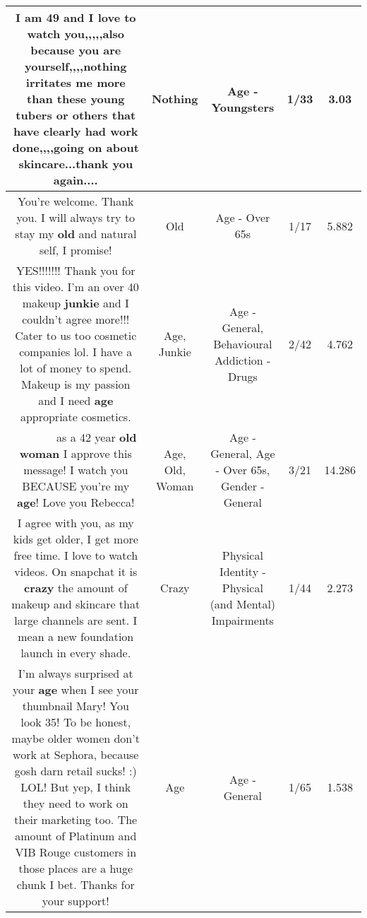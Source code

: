 \documentclass[11pt]{article}
\newlength\mylength
\begin{document}
\begin{center}
\begin{longtable}{|C{.65\mylength}|C{.30\mylength}|C{.12\mylength}|C{.12\mylength}|C{.12\mylength}|}
  \small I am 49 and I love to watch you,,,,,also because  you are yourself,,,,\textbf{nothing} irritates me more than these young tubers or others that have clearly had work done,,,,going on about  skincare...thank you again....\normalsize   & Nothing & Age - Youngsters & 1/33 & 3.03 \\  \hline
  \small You're welcome. Thank you. I will always try to stay my \textbf{old} and natural self, I promise!\normalsize   & Old & Age - Over 65s & 1/17 & 5.882 \\  \hline
  \small YES!!!!!!! Thank you for this video. I'm an over 40 makeup \textbf{junkie} and I couldn't agree more!!! Cater to us too cosmetic companies lol. I have a lot of money to spend. Makeup is my passion and I need \textbf{age} appropriate cosmetics.\normalsize   & Age, Junkie & Age - General, Behavioural Addiction - Drugs & 2/42 & 4.762 \\  \hline
  \small 👏🏼👏🏼👏🏼👏🏼👏🏼👏🏼 as a 42 year \textbf{old} \textbf{woman} I approve this message! I watch you BECAUSE you're my \textbf{age}! Love you Rebecca!\normalsize   & Age, Old, Woman & Age - General, Age - Over 65s, Gender - General & 3/21 & 14.286 \\  \hline
  \small I agree with you, as my kids get older, I get more free time. I love to watch videos. On snapchat it is \textbf{crazy} the amount of makeup and skincare that large channels are sent. I mean a new foundation launch in every shade.\normalsize   & Crazy & Physical Identity - Physical (and Mental) Impairments & 1/44 & 2.273 \\  \hline
  \small I'm always surprised at your \textbf{age} when I see your thumbnail Mary! You look 35! To be honest, maybe older women don't work at Sephora, because gosh darn retail sucks! :) LOL! But yep, I think they need to work on their marketing too. The amount of Platinum and VIB Rouge customers in those places are a huge chunk I bet. Thanks for your support!\normalsize   & Age & Age - General & 1/65 & 1.538 \\  \hline

\end{longtable}
\end{center}
\end{document}
